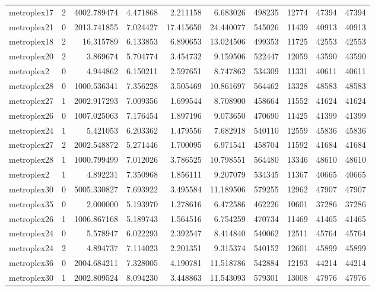 \begin{longtable}{|l|r|r|r|r|r|r|r|r|r|}
metroplex17 & 2 & 4002.789474 & 4.471868 & 2.211158 & 6.683026 & 498235 & 12774 & 47394 & 47394 \\
metroplex21 & 0 & 2013.741855 & 7.024427 & 17.415650 & 24.440077 & 545026 & 11439 & 40913 & 40913 \\
metroplex18 & 2 & 16.315789 & 6.133853 & 6.890653 & 13.024506 & 499353 & 11725 & 42553 & 42553 \\
metroplex20 & 2 & 3.869674 & 5.704774 & 3.454732 & 9.159506 & 522447 & 12059 & 43590 & 43590 \\
metroplex2 & 0 & 4.944862 & 6.150211 & 2.597651 & 8.747862 & 534309 & 11331 & 40611 & 40611 \\
metroplex28 & 0 & 1000.536341 & 7.356228 & 3.505469 & 10.861697 & 564462 & 13328 & 48583 & 48583 \\
metroplex27 & 1 & 2002.917293 & 7.009356 & 1.699544 & 8.708900 & 458664 & 11552 & 41624 & 41624 \\
metroplex26 & 0 & 1007.025063 & 7.176454 & 1.897196 & 9.073650 & 470690 & 11425 & 41399 & 41399 \\
metroplex24 & 1 & 5.421053 & 6.203362 & 1.479556 & 7.682918 & 540110 & 12559 & 45836 & 45836 \\
metroplex27 & 2 & 2002.548872 & 5.271446 & 1.700095 & 6.971541 & 458704 & 11592 & 41684 & 41684 \\
metroplex28 & 1 & 1000.799499 & 7.012026 & 3.786525 & 10.798551 & 564480 & 13346 & 48610 & 48610 \\
metroplex2 & 1 & 4.892231 & 7.350968 & 1.856111 & 9.207079 & 534345 & 11367 & 40665 & 40665 \\
metroplex30 & 0 & 5005.330827 & 7.693922 & 3.495584 & 11.189506 & 579255 & 12962 & 47907 & 47907 \\
metroplex35 & 0 & 2.000000 & 5.193970 & 1.278616 & 6.472586 & 462226 & 10601 & 37286 & 37286 \\
metroplex26 & 1 & 1006.867168 & 5.189743 & 1.564516 & 6.754259 & 470734 & 11469 & 41465 & 41465 \\
metroplex24 & 0 & 5.578947 & 6.022293 & 2.392547 & 8.414840 & 540062 & 12511 & 45764 & 45764 \\
metroplex24 & 2 & 4.894737 & 7.114023 & 2.201351 & 9.315374 & 540152 & 12601 & 45899 & 45899 \\
metroplex36 & 0 & 2004.684211 & 7.328005 & 4.190781 & 11.518786 & 542884 & 12193 & 44214 & 44214 \\
metroplex30 & 1 & 2002.809524 & 8.094230 & 3.448863 & 11.543093 & 579301 & 13008 & 47976 & 47976 \\

\end{longtable}
